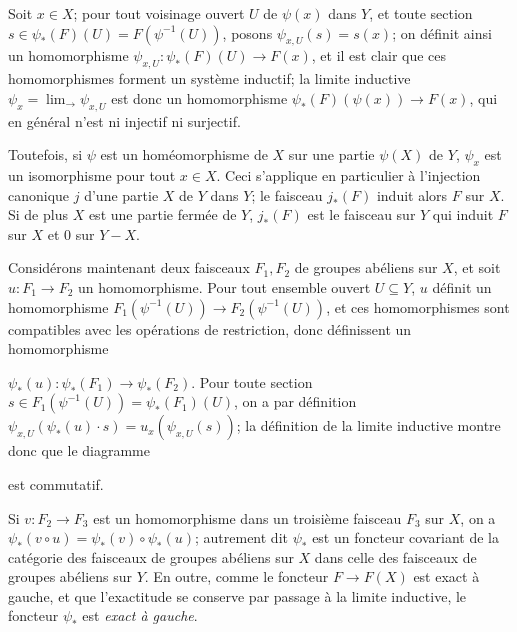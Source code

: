 Soit $x \in X$; pour tout voisinage ouvert $U$ de $\psi(x)$ dans $Y$, et toute section $s \in \psi_*(F)(U) = F(\psi^{-1}(U))$, posons $\psi_{x,U}(s) = s(x)$; on définit ainsi un homomorphisme $\psi_{x,U}: \psi_*(F)(U) \to F(x)$, et il est clair que ces homomorphismes forment un système inductif; la limite inductive $\psi_x = \lim_{\to} \psi_{x,U}$ est donc un homomorphisme $\psi_*(F)(\psi(x)) \to F(x)$, qui en général n'est ni injectif ni surjectif.

Toutefois, si $\psi$ est un homéomorphisme de $X$ sur une partie $\psi(X)$ de $Y$, $\psi_x$ est un isomorphisme pour tout $x \in X$. Ceci s'applique en particulier à l'injection canonique $j$ d'une partie $X$ de $Y$ dans $Y$; le faisceau $j_*(F)$ induit alors $F$ sur $X$. Si de plus $X$ est une partie fermée de $Y$, $j_*(F)$ est le faisceau sur $Y$ qui induit $F$ sur $X$ et $0$ sur $Y-X$.

Considérons maintenant deux faisceaux $F_1, F_2$ de groupes abéliens sur $X$, et soit $u: F_1 \to F_2$ un homomorphisme. Pour tout ensemble ouvert $U \subseteq Y$, $u$ définit un homomorphisme $F_1(\psi^{-1}(U)) \to F_2(\psi^{-1}(U))$, et ces homomorphismes sont compatibles avec les opérations de restriction, donc définissent un homomorphisme

\newpage


$\psi_*(u) : \psi_*(F_1) \to \psi_*(F_2)$. Pour toute section $s \in F_1(\psi^{-1}(U)) = \psi_*(F_1)(U)$, on a par définition $\psi_{x,U}(\psi_*(u) \cdot s) = u_x(\psi_{x,U}(s))$; la définition de la limite inductive montre donc que le diagramme


est commutatif.

Si $v : F_2 \to F_3$ est un homomorphisme dans un troisième faisceau $F_3$ sur $X$, on a $\psi_*(v \circ u) = \psi_*(v) \circ \psi_*(u)$; autrement dit $\psi_*$ est un foncteur covariant de la catégorie des faisceaux de groupes abéliens sur $X$ dans celle des faisceaux de groupes abéliens sur $Y$. En outre, comme le foncteur $F \to F(X)$ est exact à gauche, et que l'exactitude se conserve par passage à la limite inductive, le foncteur $\psi_*$ est \emph{exact à gauche}.

